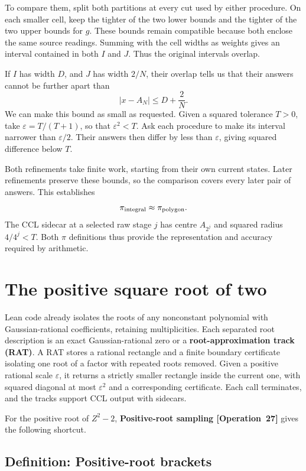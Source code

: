\documentclass[11pt]{article}
\newcommand{\entryname}[3]{\textbf{#3 \mbox{[#1~#2]}}}
\begin{document}
To compare them, split both partitions at every cut used by either
procedure. On each smaller cell, keep the tighter of the two lower bounds
and the tighter of the two upper bounds for $g$. These bounds remain
compatible because both enclose the same source readings. Summing with
the cell widths as weights gives an interval contained in both $I$ and
$J$. Thus the original intervals overlap.

If $I$ has width $D$, and $J$ has width $2/N$, their overlap tells us
that their answers cannot be further apart than
\[
                            |x-A_N|\leq D+\frac2N.
\]
We can make this bound as small as requested. Given a squared tolerance
$T>0$, take $\varepsilon=T/(T+1)$, so that $\varepsilon^2<T$. Ask each
procedure to make its interval narrower than $\varepsilon/2$. Their answers
then differ by less than $\varepsilon$, giving squared difference below $T$.

Both refinements take finite work, starting from their own current states.
Later refinements preserve these bounds, so the comparison covers every
later pair of answers. This establishes
\[
                        \pi_{\rm integral}\approx\pi_{\rm polygon}.
\]
The CCL sidecar at a selected raw stage $j$ has centre $A_{2^j}$ and
squared radius $4/4^j<T$. Both $\pi$ definitions thus provide the
representation and accuracy required by arithmetic.

\section{The positive square root of two}\label{sec:root}

Lean code already isolates the roots of any nonconstant polynomial with
Gaussian-rational coefficients, retaining multiplicities. Each separated
root description is an exact Gaussian-rational zero or a
\textbf{root-approximation track (RAT)}. A RAT stores a rational rectangle
and a finite boundary certificate isolating one root of a factor with
repeated roots removed. Given a positive rational scale $\varepsilon$,
it returns a strictly smaller rectangle inside the current one, with
squared diagonal at most $\varepsilon^2$ and a corresponding certificate.
Each call terminates, and the tracks support CCL output with sidecars.

For the positive root of $Z^2-2$, \entryname{Operation}{27}{Positive-root sampling}
gives the following shortcut.

\subsection*{Definition: Positive-root brackets}
\end{document}
